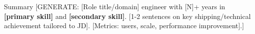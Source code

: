 \documentclass{resume}
\begin{document}
%
%
%
%

\vspace{-0.15cm}

\begin{rSection}{Summary}
[GENERATE: [Role title/domain] engineer with [N]+ years in \textbf{[primary skill]} and \textbf{[secondary skill]}. [1-2 sentences on key shipping/technical achievement tailored to JD]. [Metrics: users, scale, performance improvement].]
\end{rSection}
\vspace{-0.15cm}
\end{document}
